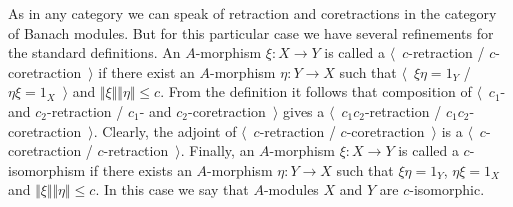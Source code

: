 As in any category we can speak of retraction and     coretractions in the
category of Banach modules. But for this particular case we have several
refinements for the standard definitions. An $A$-morphism $\xi:X\to Y$ is called
a $\langle$~$c$-retraction / $c$-coretraction~$\rangle$ if there exist an
$A$-morphism $\eta:Y\to X$ such that $\langle$~$\xi\eta=1_Y$ /
$\eta\xi=1_X$~$\rangle$ and $\Vert\xi\Vert\Vert\eta\Vert\leq c$. From the
definition it follows that composition of $\langle$~$c_1$- and $c_2$-retraction
/ $c_1$- and $c_2$-coretraction~$\rangle$ gives a $\langle$~$c_1c_2$-retraction
/ $c_1c_2$-coretraction~$\rangle$. Clearly, the adjoint of
$\langle$~$c$-retraction / $c$-coretraction~$\rangle$ is a
$\langle$~$c$-coretraction / $c$-retraction~$\rangle$. Finally, an $A$-morphism
$\xi:X\to Y$ is called a $c$-isomorphism if there exists an $A$-morphism
$\eta:Y\to X$ such that $\xi\eta=1_Y$, $\eta\xi=1_X$ and
$\Vert\xi\Vert\Vert\eta\Vert\leq c$. In this case we say that $A$-modules $X$
and $Y$ are $c$-isomorphic.

